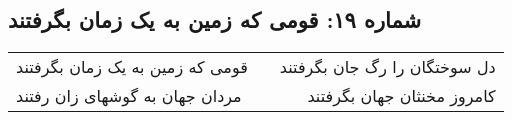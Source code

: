 \begin{center}
\section*{شماره ۱۹: قومی که زمین به یک زمان بگرفتند}
\label{sec:019}
\begin{longtable}{l p{0.5cm} r}
قومی که زمین به یک زمان بگرفتند
&&
دل سوختگان را رگ جان بگرفتند
\\
مردان جهان به گوشهای زان رفتند
&&
کامروز مخنثان جهان بگرفتند
\\
\end{longtable}
\end{center}
